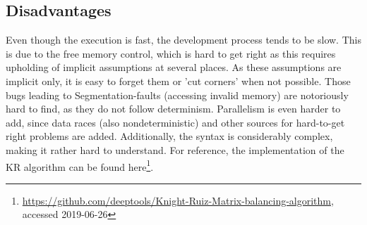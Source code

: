 \subsection{Disadvantages}

Even though the execution is fast, the development process tends to be slow.
This is due to the free memory control, which is hard to get right as this
requires upholding of implicit assumptions at several places. As these
assumptions are implicit only, it is easy to forget them or 'cut corners' when
not possible. Those bugs leading to Segmentation-faults (accessing invalid
memory) are notoriously hard to find, as they do not follow determinism.
Parallelism is even harder to add, since data races (also nondeterministic) and
other sources for hard-to-get right problems are added. Additionally, the
syntax is considerably complex, making it rather hard to understand.
For reference, the implementation of the KR algorithm can be found
here\footnote{\url{https://github.com/deeptools/Knight-Ruiz-Matrix-balancing-algorithm},
\\ accessed 2019-06-26}.


